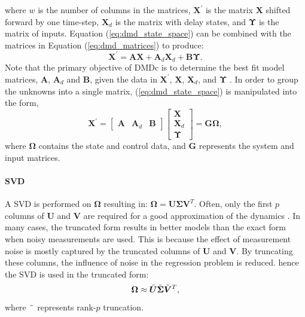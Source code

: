    where $w$ is the number of columns in the matrices, 
    $\bm{X^\prime}$ is the matrix $\bm{X}$ shifted forward by one time-step, 
    $\bm{X}_d$ is the matrix with delay states, 
    and $\bm{\Upsilon}$ is the matrix of inputs.
    Equation (\ref{eq:dmd_state_space}) can be combined with the matrices in Equation (\ref{eq:dmd_matrices}) to produce:
    \begin{equation}
        \bm{X^\prime} = \bm{A} \bm{X} + \bm{A}_d \bm{X}_d + \bm{B} \bm{\Upsilon} .
    \end{equation}
    Note that the primary objective of DMDc is to determine the best fit model matrices, $\bm{A}$, $\bm{A}_d$ and $\bm{B}$, 
    given the data in $\bm{X^\prime}$, $\bm{X}$, $\bm{X}_d$, and $\bm{\Upsilon}$ \cite{Proctor2016c}.
    In order to group the unknowns into a single matrix, (\ref{eq:dmd_state_space}) is manipulated into the form,
    \begin{equation} \label{eq:G_Omega}
        \bm{X^\prime} =   
        \begin{bmatrix} 
            \bm{A} & \bm{A}_d & \bm{B} 
        \end{bmatrix}
        \begin{bmatrix} 
            \bm{X} \\ \bm{X}_d \\ \bm{\Upsilon} 
        \end{bmatrix} 
        = \bm{G \Omega} ,
    \end{equation} 
    where $\bm{\Omega}$ contains the state and control data, and $\bm{G}$ represents the system and input matrices.
    
    \paragraph{SVD}
    A SVD is performed on $\bm{\Omega}$ resulting in:
    \(
        \bm{\Omega} = \bm{U} \bm{\Sigma} \bm{V}^T
    \).
    Often, only the first $p$ columns of $\bm{U}$ and $\bm{V}$ are required for a good approximation of the dynamics \cite{Brunton2017a}.
    In many cases, the truncated form results in better models than the exact form when noisy measurements are used.
    This is because the effect of measurement noise is mostly captured by the truncated columns of $\bm{U}$ and $\bm{V}$.
    By truncating these columns, the influence of noise in the regression problem is reduced. 
    hence the SVD is used in the truncated form: 
    \begin{equation} \label{eq:tilde_svd}
        \bm{\Omega} \approx \Tilde{\bm{U}} \Tilde{\bm{\Sigma}} \Tilde{\bm{V}}^T ,
    \end{equation}
    where $\phantom{.} \Tilde{ } \phantom{.}$ represents rank-$p$ truncation.

